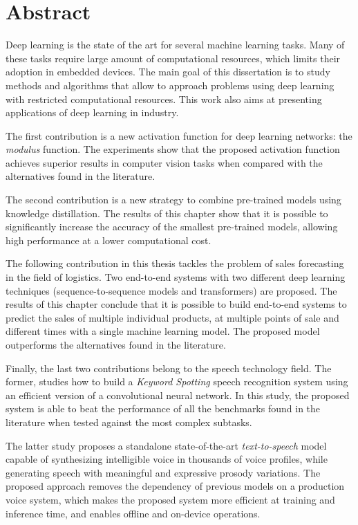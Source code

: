 
\chapter*{Abstract}


Deep learning is the state of the art for several machine learning tasks. Many of these tasks require large amount of computational resources, which limits their adoption in embedded devices. The main goal of this dissertation is to study methods and algorithms that allow to approach problems using deep learning with restricted computational resources. This work also aims at presenting applications of deep learning in industry.

The first contribution is a new activation function for deep learning networks: the \textit{modulus} function. The experiments show that the proposed activation function achieves superior results in computer vision tasks when compared with the alternatives found in the literature.

The second contribution is a new strategy to combine pre-trained models using knowledge distillation. The results of this chapter show that it is possible to significantly increase the accuracy of the smallest pre-trained models, allowing high performance at a lower computational cost.

The following contribution in this thesis tackles the problem of sales forecasting in the field of logistics. Two end-to-end systems with two different deep learning techniques (sequence-to-sequence models and transformers) are proposed. The results of this chapter conclude that it is possible to build end-to-end systems to predict the sales of multiple individual products, at multiple points of sale and different times with a single machine learning model. The proposed model outperforms the alternatives found in the literature.

Finally, the last two contributions belong to the speech technology field. The former, studies how to build a \textit{Keyword Spotting} speech recognition system using an efficient version of a convolutional neural network. In this study, the proposed system is able to beat the performance of all the benchmarks found in the literature when tested against the most complex subtasks. 

The latter study proposes a standalone state-of-the-art \textit{text-to-speech} model capable of synthesizing intelligible voice in thousands of voice profiles, while generating speech with meaningful and expressive prosody variations. The proposed approach removes the dependency of previous models on a production voice system, which makes the proposed system more efficient at training and inference time, and enables offline and on-device operations. 





\clearpage

